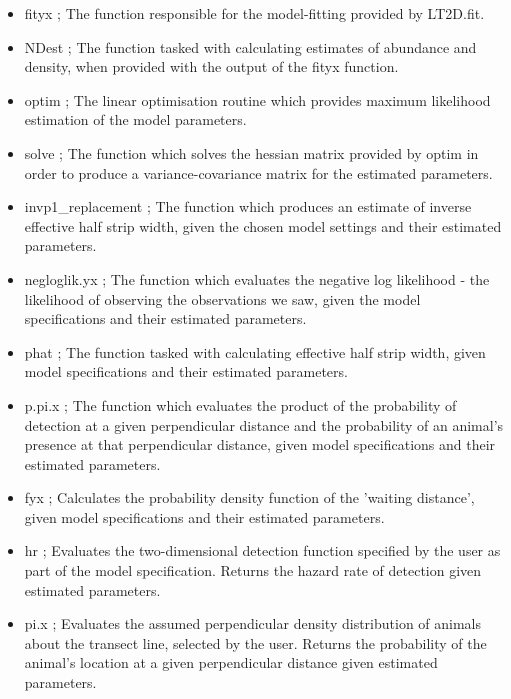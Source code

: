 \documentclass[11pt]{article}
\begin{document}
\begin{multicols}{2}
\begin{itemize}
\item fityx ; The function responsible for the model-fitting provided by LT2D.fit.

\item NDest ; The function tasked with calculating estimates of abundance and density, when provided with the output of the fityx function.

\item optim ; The linear optimisation routine which provides maximum likelihood estimation of the model parameters.

\item solve ; The function which solves the hessian matrix provided by optim in order to produce a variance-covariance matrix for the estimated parameters.

\item invp1\_replacement ; The function which produces an estimate of inverse effective half strip width, given the chosen model settings and their estimated parameters.

\item negloglik.yx ; The function which evaluates the negative log likelihood - the likelihood of observing the observations we saw, given the model specifications and their estimated parameters.

\item phat ; The function tasked with calculating effective half strip width, given model specifications and their estimated parameters.

\item p.pi.x ; The function which evaluates the product of the probability of detection at a given perpendicular distance and the probability of an animal's presence at that perpendicular distance, given model specifications and their estimated parameters.

\item fyx ; Calculates the probability density function of the 'waiting distance', given model specifications and their estimated parameters.

\item hr ; Evaluates the two-dimensional detection function specified by the user as part of the model specification. Returns the hazard rate of detection given estimated parameters.

\item pi.x ; Evaluates the assumed perpendicular density distribution of animals about the transect line, selected by the user. Returns the probability of the animal's location at a given perpendicular distance given estimated parameters.


\end{itemize}
\end{multicols}
\end{document}
